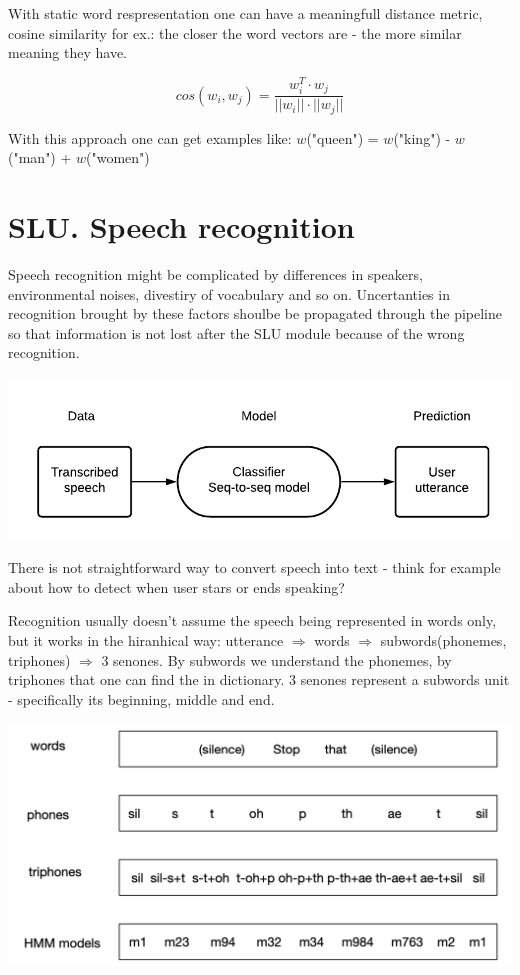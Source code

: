 \documentclass[12pt,titlepage,a4paper]{article}
\begin{document}
\par
With static word respresentation one can have a meaningfull distance metric, cosine similarity for ex.: the closer the word vectors are - the more similar meaning they have.

\begin{equation}
    cos(w_i,w_j) = \frac{w_i^T \cdot w_j}{||w_i|| \cdot ||w_j||}
\end{equation}

With this approach one can get examples like: $w$("queen") = $w$("king") - $w$("man") + $w$("women")
\par

\pagebreak

\section{SLU. Speech recognition}
Speech recognition might be complicated by differences in speakers, environ\-mental noises, divestiry of vocabulary and so on. Uncertanties in recognition brought by these factors shoulbe be propagated through the pipeline so that information is not lost after the SLU module because of the wrong recognition.
\begin{center}
    \includegraphics{training-1.png}
\end{center}
\par 
There is not straightforward way to convert speech into text - think for example about how to detect when user stars or ends speaking?
\par Recognition usually doesn't assume the speech being represented in words only, but it works in the hiranhical way: utterance $\Rightarrow$ words $\Rightarrow$ subwords(pho\-nemes, triphones) $\Rightarrow$ 3 senones. By subwords we understand the phonemes, by triphones that one can find the in dictionary. 3 senones represent a subwords unit - specifically its beginning, middle and end.

\begin{center}
    \includegraphics[width=\linewidth]{hierarcy-speech.png}
\end{center}
\end{document}
